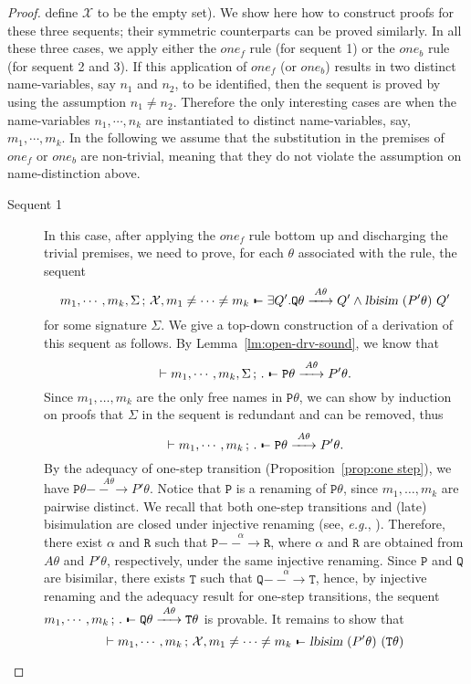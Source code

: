 \documentclass{acmtrans2m}
\newcommand{\eg}{{\em e.g.}}
\def\Xscr{{\mathcal X}}
\def\Ppi{{\mathtt P}}
\def\Qpi{{\mathtt Q}}
\def\Rpi{{\mathtt R}}
\def\Tpi{{\mathtt T}}
\def\relbar{\mathrel{\smash-}}
\def\joinrelm{\mathrel{\mkern-3.2mu}}
\def\tailpiece{\kern 1pt\vrule height 1ex width 0.3ex depth -.25ex}
\def\seqsym{\mathrel{\tailpiece\joinrelm\relbar}}
\newcommand{\NSeq}[3]{#1\,;\,#2 \seqsym #3}
\newcommand{\lbisim}[2]{\hbox{\sl lbisim}~#1~#2}
\newcommand{\one  }[3]{#1\stackrel{#2}{-\!\!-\!\!\!\rightarrow    } #3}
\begin{document}
\begin{proof}
define $\Xscr$ to be the empty set). 
We show here how to construct proofs for these three sequents; their symmetric counterparts can be
proved similarly. In all these three cases, we apply either the $one_f$ rule (for sequent 1) 
or the $one_b$ rule (for sequent 2 and 3). If this application of $one_f$ (or $one_b$)
results in two distinct name-variables, say $n_1$ and $n_2$, to be identified, then
the sequent is proved by using the assumption $n_1 \not = n_2.$ Therefore the only 
interesting cases are when the name-variables $n_1, \cdots, n_k$ are instantiated to 
distinct name-variables, say, $m_1, \cdots, m_k$. In the following we assume
that the substitution in the premises of $one_f$ or $one_b$ are non-trivial,
meaning that they do not violate the assumption on name-distinction above.
\begin{description}
\item[Sequent 1] In this case, after applying the $one_f$ rule bottom up
and discharging the trivial premises, we need to prove, 
for each $\theta$ associated with the rule, the sequent
$$
\NSeq{m_1, \cdots, m_k, \Sigma}{\Xscr, m_1 \not = \cdots \not = m_k}{\exists Q'. \one{\Qpi\theta}{A\theta}{Q'}
\land \lbisim{(P'\theta)}{Q'}}
$$
for some signature $\Sigma.$ We give a top-down construction of a derivation of this sequent as follows. 
By Lemma~\ref{lm:open-drv-sound}, we know that 
$$\vdash \NSeq{m_1,\cdots, m_k, \Sigma}{.}{\one{\Ppi\theta}{A\theta}{P'\theta}}.$$
Since $m_1, \ldots, m_k$ are the only free names in $\Ppi\theta$, we can show by
induction on proofs that $\Sigma$ in the sequent is redundant and can be removed,
thus 
$$\vdash \NSeq{m_1,\cdots, m_k}{.}{\one{\Ppi\theta}{A\theta}{P'\theta}}.$$
By the adequacy of one-step transition (Proposition~\ref{prop:one step}),
we have
$\one{\Ppi\theta}{A\theta}{P'\theta}.$ Notice that $\Ppi$ is a renaming of $\Ppi\theta$, since
$m_1, \ldots, m_k$ are pairwise distinct. We recall that both one-step
transitions and (late) bisimulation are closed under injective renaming 
(see, \eg, \cite{milner92icII}). Therefore, there exist $\alpha$ and $\Rpi$ such that
$\one{\Ppi}{\alpha}{\Rpi}$, where $\alpha$ and $\Rpi$ are obtained from $A\theta$ and $P'\theta$, respectively,
under the same injective renaming. Since $\Ppi$ and $\Qpi$ are bisimilar, there exists
$\Tpi$ such that $\one{\Qpi}{\alpha}{\Tpi}$, hence, by injective renaming and the adequacy
result for one-step transitions, the sequent 
$\NSeq{m_1,\cdots, m_k}{.}{\one{\Qpi\theta}{A\theta}{\Tpi\theta}}$ is provable. It remains to show
that 
$$
\vdash \NSeq{m_1,\cdots, m_k}{\Xscr, m_1 \not = \cdots \not = m_k}{\lbisim {(P'\theta)}{(\Tpi\theta)}}
$$
\end{description}
\end{proof}
\end{document}
